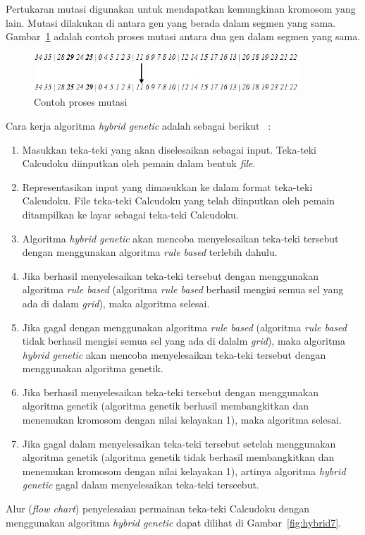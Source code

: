 Pertukaran mutasi digunakan untuk mendapatkan kemungkinan kromosom yang lain. Mutasi dilakukan di antara gen yang berada dalam segmen yang sama. Gambar~\ref{fig:hybrid10} adalah contoh proses mutasi antara dua gen dalam segmen yang sama.

\begin{figure}
\centering
\captionsetup{justification=centering}
\includegraphics[scale=1]{Gambar/HybridGenetic10}
\caption[Contoh proses mutasi ~\cite{johanna:12:hybrid}]{Contoh proses mutasi ~\cite{johanna:12:hybrid}}
\label{fig:hybrid10}
\end{figure}

Cara kerja algoritma \textit{hybrid genetic} adalah sebagai berikut ~\cite{johanna:12:hybrid}:
\begin{enumerate}
\item Masukkan teka-teki yang akan diselesaikan sebagai input. Teka-teki Calcudoku diinputkan oleh pemain dalam bentuk \textit{file}.
\item Representasikan input yang dimasukkan ke dalam format teka-teki Calcudoku. File teka-teki Calcudoku yang telah diinputkan oleh pemain ditampilkan ke layar sebagai teka-teki Calcudoku.
\item Algoritma \textit{hybrid genetic} akan mencoba menyelesaikan teka-teki tersebut dengan menggunakan algoritma \textit{rule based} terlebih dahulu.
\item Jika berhasil menyelesaikan teka-teki tersebut dengan menggunakan algoritma \textit{rule based }(algoritma \textit{rule based} berhasil mengisi semua sel yang ada di dalam \textit{grid}), maka algoritma selesai.
\item Jika gagal dengan menggunakan algoritma \textit{rule based} (algoritma \textit{rule based} tidak berhasil mengisi semua sel yang ada di dalalm \textit{grid}), maka algoritma \textit{hybrid genetic} akan mencoba menyelesaikan teka-teki tersebut dengan menggunakan algoritma genetik.
\item Jika berhasil menyelesaikan teka-teki tersebut dengan menggunakan algoritma genetik (algoritma genetik berhasil membangkitkan dan menemukan kromosom dengan nilai kelayakan 1), maka algoritma selesai.
\item Jika gagal dalam menyelesaikan teka-teki tersebut setelah menggunakan algoritma genetik (algoritma genetik tidak berhasil membangkitkan dan menemukan kromosom dengan nilai kelayakan 1), artinya algoritma \textit{hybrid genetic} gagal dalam menyelesaikan teka-teki terseebut.
\end{enumerate}
Alur (\textit{flow chart}) penyelesaian permainan teka-teki Calcudoku dengan menggunakan algoritma \textit{hybrid genetic} dapat dilihat di Gambar~\ref{fig:hybrid7}.

